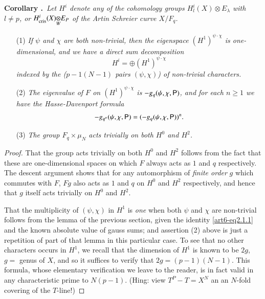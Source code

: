 \medskip
\noindent
{\bf Corollary .\label{art6-coro2.2}}~{\em Let $H^{i}$ denote any of the cohomology groups $H^{i}_{l}(X)\otimes E_{\lambda}$ with $l\neq p$, or $\foprod{H^{i}_{\text{cris}}(X)}{E_{P}}{W}$ of the Artin Schreier curve $X/F_{q}$.}
\begin{itemize}
\item[(1)] {\em If $\psi$ and $\chi$ are both non-trivial, then the eigenspace $(H^{1})^{\psi\cdot \chi}$ is one-dimensional, and we have a direct sum decomposition}
$$
H^{i}=\oplus (H^{1})^{\psi\cdot \chi}
$$
{\em indexed by the ($p-1(N-1)$ pairs $(\psi,\chi)$) of non-trivial characters.}

\item[(2)] {\em The eigenvalue of $F$ on $(H^{1})^{\psi\cdot \chi}$ is $-g_{q}(\psi,\chi,\mathsf{P})$, and for each $n\geq 1$ we have the Hasse-Davenport formula}
$$
-g_{q^{n}}(\psi,\chi,\mathsf{P})=(-g_{q}(\psi,\chi,\mathsf{P}))^{n}.
$$

\item[(3)] {\em The group $F_{q}\times \mu_{N}$ acts trivially on both $H^{0}$ and $H^{2}$.}
\end{itemize}

\begin{proof}
That the group acts trivially on both $H^{0}$ and $H^{2}$ follows from the fact that these are one-dimensional spaces on which $F$ always acts as $1$ and $q$ respectively. The descent argument shows that for any automorphism of {\em finite order} $g$ which commutes with $F$, $Fg$ also acts as $1$ and $q$ on $H^{0}$ and $H^{2}$ respectively, and hence that $g$ itself acts trivially on $H^{0}$ and $H^{2}$.

That the multiplicity of $(\psi,\chi)$ in $H^{1}$ is {\em one} when both $\psi$ and $\chi$ are non-trivial follows from the lemma of the previous section, given the identity \eqref{art6-eq2.1.1} and the known absolute value of gauss sums; and assertion (2) above is just a repetition of part of that lemma in this particular case. To see that no other characters occurs in $H^{1}$, we recall that the dimension of $H^{1}$ is known to be $2g$, $g=$ genus of $X$, and so it suffices to verify that $2g=(p-1)(N-1)$. This formula, whose elementary verification we leave to the reader, is in fact valid in any characteristic prime to $N(p-1)$. (Hing: view $T^{P}-T=X^{N}$ an an $N$-fold covering of the $T$-line!)
\end{proof}

